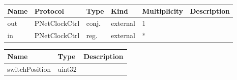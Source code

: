 

\begin{tabular}[ht]{|l|l|l|l|l|p{5cm}|}
\hline
\textbf{Name} & \textbf{Protocol} & \textbf{Type} & \textbf{Kind} & \textbf{Multiplicity} & \textbf{Description}\\
\hline
out & PNetClockCtrl & conj. & external & 1 & \\
\hline
in & PNetClockCtrl & reg. & external & * & \\
\hline
\end{tabular}


\begin{par}

\end{par}


\begin{tabular}[ht]{|l|l|p{8cm}|}
\hline
\textbf{Name} & \textbf{Type} & \textbf{Description}\\
\hline
switchPosition & uint32 & \\
\hline
\end{tabular}

